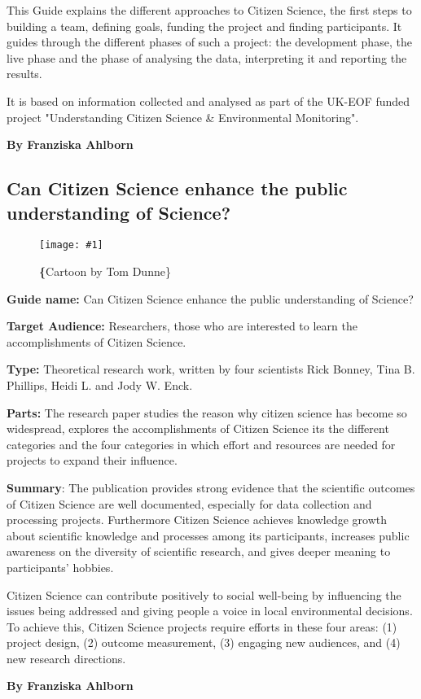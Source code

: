 \documentclass{article}
\newlength{\imgwidth}
\newcommand\scaledgraphics[2]{%
                
\settowidth{\imgwidth}{\texttt{[image: \#1]}}%
                
\setlength{\imgwidth}{\minof{\imgwidth}{#2\textwidth}}%
                
\texttt{[image: \#1]}%
                
}
\begin{document}
This Guide explains the different approaches to Citizen Science, the first steps to building a team, defining goals, funding the project and finding participants. It guides through the different phases of such a project: the development phase, the live phase and the phase of analysing the data, interpreting it and reporting the results.


It is based on information collected and analysed as part of the UK-EOF funded project "Understanding Citizen Science \& Environmental Monitoring".


\textbf{By Franziska Ahlborn}


\subsection{Can Citizen Science enhance the public understanding of Science?}\label{H2333653}



\begin{center}
\begin{figure}
\scaledgraphics{fb9872a4-8371-4bfe-a930-f1d621c5649e.png}{0.5}
\caption*{\textbf\{Cartoon by Tom Dunne\}}\label{F26530171}
\end{figure}


\end{center}





\textbf{Guide name: }Can Citizen Science enhance the public understanding of Science?\textbf{ } \autocite{bonney_can_2015}


\textbf{Target Audience: }Researchers, those who are interested to learn the accomplishments of Citizen Science.


\textbf{Type: }Theoretical research work, written by four scientists Rick Bonney, Tina B. Phillips, Heidi L. and Jody W. Enck.


\textbf{Parts: }The research paper studies the reason why citizen science has become so widespread, explores the accomplishments of Citizen Science its the different categories and the four categories in which effort and resources are needed for projects to expand their influence.


\textbf{Summary}: The publication provides strong evidence that the scientific outcomes of Citizen Science are well documented, especially for data collection and processing projects. Furthermore Citizen Science achieves knowledge growth about scientific knowledge and processes among its participants, increases public awareness on the diversity of scientific research, and gives deeper meaning to participants' hobbies.


Citizen Science can contribute positively to social well-being by influencing the issues being addressed and giving people a voice in local environmental decisions. To achieve this, Citizen Science projects require efforts in these four areas: (1) project design, (2) outcome measurement, (3) engaging new audiences, and (4) new research directions.


\textbf{By Franziska Ahlborn}


\printbibliography[title={Bibliography}]
\end{document}
